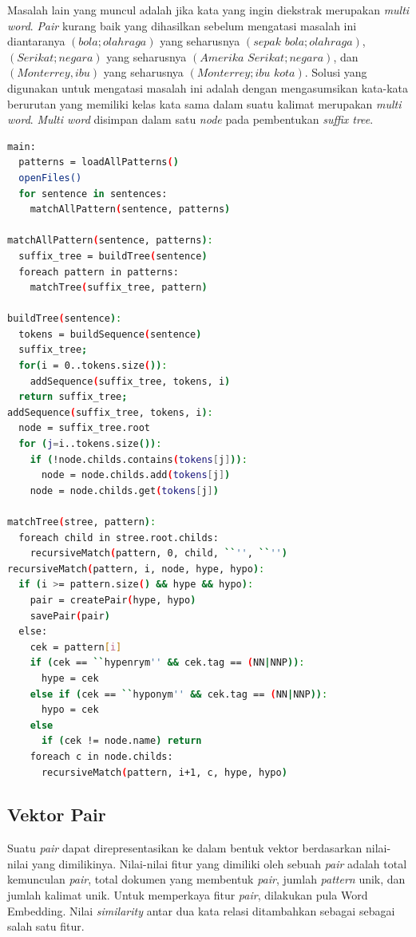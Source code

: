 Masalah lain yang muncul adalah jika kata yang ingin diekstrak merupakan \textit{multi word}. \textit{Pair} kurang baik yang dihasilkan sebelum mengatasi masalah ini diantaranya $(bola;olahraga)$ yang seharusnya $(sepak\,\,bola;olahraga)$, $(Serikat;negara)$ yang seharusnya $(Amerika\,\,Serikat;negara)$, dan $(Monterrey,ibu)$ yang seharusnya $(Monterrey;ibu\,\,kota)$. Solusi yang digunakan untuk mengatasi masalah ini adalah dengan mengasumsikan kata-kata berurutan yang memiliki kelas kata sama dalam suatu kalimat merupakan \textit{multi word}. \textit{Multi word} disimpan dalam satu \textit{node} pada pembentukan \textit{suffix tree}.
\begin{lstlisting}[language=bash]
main:
  patterns = loadAllPatterns()
  openFiles()
  for sentence in sentences:
    matchAllPattern(sentence, patterns)

matchAllPattern(sentence, patterns):
  suffix_tree = buildTree(sentence)
  foreach pattern in patterns:
    matchTree(suffix_tree, pattern)
  
buildTree(sentence):
  tokens = buildSequence(sentence)
  suffix_tree;
  for(i = 0..tokens.size()):
    addSequence(suffix_tree, tokens, i)
  return suffix_tree;
addSequence(suffix_tree, tokens, i):
  node = suffix_tree.root
  for (j=i..tokens.size()):
    if (!node.childs.contains(tokens[j])):
      node = node.childs.add(tokens[j])
    node = node.childs.get(tokens[j])

matchTree(stree, pattern):
  foreach child in stree.root.childs:
    recursiveMatch(pattern, 0, child, ``'', ``'')
recursiveMatch(pattern, i, node, hype, hypo):
  if (i >= pattern.size() && hype && hypo):
    pair = createPair(hype, hypo)
    savePair(pair)
  else:
    cek = pattern[i]
    if (cek == ``hypenrym'' && cek.tag == (NN|NNP)):
      hype = cek
    else if (cek == ``hyponym'' && cek.tag == (NN|NNP)):
      hypo = cek
    else 
      if (cek != node.name) return
    foreach c in node.childs:
      recursiveMatch(pattern, i+1, c, hype, hypo)
\end{lstlisting}


\subsection{Vektor Pair}
Suatu \textit{pair} dapat direpresentasikan ke dalam bentuk vektor berdasarkan nilai-nilai yang dimilikinya. Nilai-nilai fitur yang dimiliki oleh sebuah \textit{pair} adalah total kemunculan \textit{pair}, total dokumen yang membentuk \textit{pair}, jumlah \textit{pattern} unik, dan jumlah kalimat unik. Untuk memperkaya fitur \textit{pair}, dilakukan pula Word Embedding. Nilai \textit{similarity} antar dua kata relasi ditambahkan sebagai sebagai salah satu fitur.

